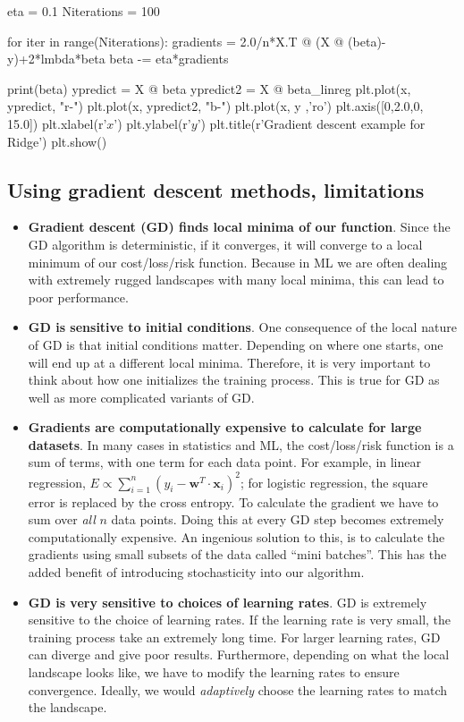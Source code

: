 \documentclass[%
oneside,                 %
final,                   %
10pt]{article}
\begin{document}
eta = 0.1
Niterations = 100

for iter in range(Niterations):
    gradients = 2.0/n*X.T @ (X @ (beta)-y)+2*lmbda*beta
    beta -= eta*gradients

print(beta)
ypredict = X @ beta
ypredict2 = X @ beta_linreg
plt.plot(x, ypredict, "r-")
plt.plot(x, ypredict2, "b-")
plt.plot(x, y ,'ro')
plt.axis([0,2.0,0, 15.0])
plt.xlabel(r'$x$')
plt.ylabel(r'$y$')
plt.title(r'Gradient descent example for Ridge')
plt.show()


\epycod

\subsection{Using gradient descent methods, limitations}

\begin{itemize}
\item \textbf{Gradient descent (GD) finds local minima of our function}. Since the GD algorithm is deterministic, if it converges, it will converge to a local minimum of our cost/loss/risk function. Because in ML we are often dealing with extremely rugged landscapes with many local minima, this can lead to poor performance.

\item \textbf{GD is sensitive to initial conditions}. One consequence of the local nature of GD is that initial conditions matter. Depending on where one starts, one will end up at a different local minima. Therefore, it is very important to think about how one initializes the training process. This is true for GD as well as more complicated variants of GD.

\item \textbf{Gradients are computationally expensive to calculate for large datasets}. In many cases in statistics and ML, the cost/loss/risk function is a sum of terms, with one term for each data point. For example, in linear regression, $E \propto \sum_{i=1}^n (y_i - \mathbf{w}^T\cdot\mathbf{x}_i)^2$; for logistic regression, the square error is replaced by the cross entropy. To calculate the gradient we have to sum over \emph{all} $n$ data points. Doing this at every GD step becomes extremely computationally expensive. An ingenious solution to this, is to calculate the gradients using small subsets of the data called ``mini batches''. This has the added benefit of introducing stochasticity into our algorithm.

\item \textbf{GD is very sensitive to choices of learning rates}. GD is extremely sensitive to the choice of learning rates. If the learning rate is very small, the training process take an extremely long time. For larger learning rates, GD can diverge and give poor results. Furthermore, depending on what the local landscape looks like, we have to modify the learning rates to ensure convergence. Ideally, we would \emph{adaptively} choose the learning rates to match the landscape.


\end{itemize}
\end{document}
